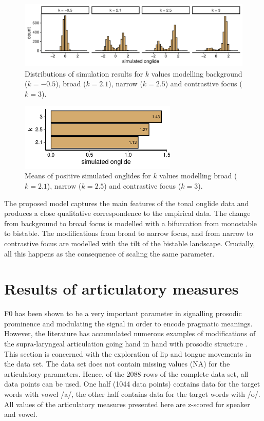 \begin{figure}[t]
\includegraphics[width=\textwidth]{figures/ch7/onglide_all_across.pdf}
\caption{Distributions of simulation results for $k$ values modelling background ($k=-0.5$), broad ($k=2.1$), narrow ($k=2.5$) and contrastive focus ($k=3$).}
\label{fig:simulation_bg_br_na_co}
\end{figure}

\begin{figure}[t]
\includegraphics[width=7.5cm]{figures/ch7/positive_means_across.pdf}
\caption{Means of positive simulated onglides for $k$ values modelling broad ($k=2.1$), narrow ($k=2.5$) and contrastive focus ($k=3$).}
\label{fig:simulation_means_bg_br_na_co}
\end{figure}

The proposed model captures the main features of the tonal onglide data and produces a close qualitative correspondence to the empirical data. The change from background to broad focus is modelled with a bifurcation from monostable to bistable. The modifications from broad to narrow focus, and from narrow to contrastive focus are modelled with the tilt of the bistable landscape. Crucially, all this happens as the consequence of scaling the same parameter.

\section{Results of articulatory measures}

F0 has been shown to be a very important parameter in signalling prosodic prominence and modulating the signal in order to encode pragmatic meanings. However, the literature has accumulated numerous examples of modifications of the supra-laryngeal articulation going hand in hand with prosodic structure \citep[for overviews see][]{Cho2011, Mücke2018}. This section is concerned with the exploration of lip and tongue movements in the data set. The data set does not contain missing values (NA) for the articulatory parameters. Hence, of the 2088 rows of the complete data set, all data points can be used. One half (1044 data points) contains data for the target words with vowel /a/, the other half contains data for the target words with /o/. All values of the articulatory measures presented here are z-scored for speaker and vowel.


